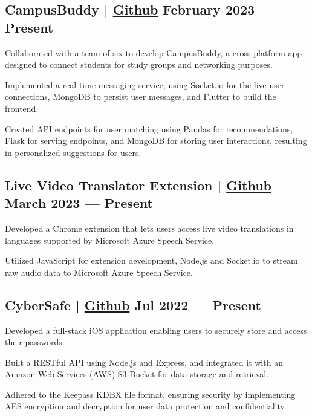 \subsection{{CampusBuddy | \href{https://github.com/pegliang/CampusBuddy}{Github} \hfill February 2023 --- Present}}
\begin{zitemize}
\item Collaborated with a team of six to develop CampusBuddy, a cross-platform app designed to connect students for study groups and networking purposes.
\item Implemented a real-time messaging service, using Socket.io for the live user connections, MongoDB to persist user messages, and Flutter to build the frontend.
\item Created API endpoints for user matching using Pandas for recommendations, Flask for serving endpoints, and MongoDB for storing user interactions, resulting in personalized suggestions for users.
\end{zitemize}

\subsection{{Live Video Translator Extension | \href{https://github.com/jerikjakobsen/Translator-Extension}{Github} \hfill March 2023 --- Present}}
\begin{zitemize}
\item Developed a Chrome extension that lets users access live video translations in languages supported by Microsoft Azure Speech Service.
\item Utilized JavaScript for extension development, Node.js and Socket.io to stream raw audio data to Microsoft Azure Speech Service.
\end{zitemize}

\subsection{{CyberSafe | \href{https://github.com/jerikjakobsen/CyberSafe}{Github} \hfill Jul 2022 --- Present}}
\begin{zitemize}
\item Developed a full-stack iOS application enabling users to securely store and access their passwords.
\item Built a RESTful API using Node.js and Express, and integrated it with an Amazon Web Services (AWS) S3 Bucket for data storage and retrieval.
\item Adhered to the Keepass KDBX file format, ensuring security by implementing AES encryption and decryption for user data protection and confidentiality.
\end{zitemize}